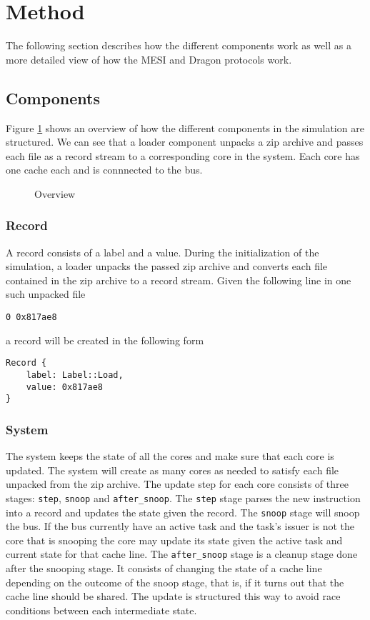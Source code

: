 \section{Method}
The following section describes how the different components work as well as a more detailed view of how the MESI and Dragon protocols work.

\subsection{Components}
Figure \ref{fig:overview} shows an overview of how the different components in the simulation are
structured. We can see that a loader component unpacks a zip archive and passes each file as a
record stream to a corresponding core in the system. Each core has one cache each and is connnected
to the bus.

\begin{figure}[ht]
    \centering
    \caption{Overview}
    \label{fig:overview}
\end{figure}



\subsubsection{Record}

A record consists of a label and a value.  During the initialization of the simulation, a loader
unpacks the passed zip archive and converts each file contained in the zip archive to a record
stream.  Given the following line in one such unpacked file
\begin{lstlisting}
0 0x817ae8
\end{lstlisting}
a record will be created in the following form
\begin{lstlisting}
Record {
    label: Label::Load,
    value: 0x817ae8
}
\end{lstlisting}


\subsubsection{System}
The system keeps the state of all the cores and make sure that each core is updated.
The system will create as many cores as needed to satisfy each file unpacked from the zip archive.
The update step for each core consists of three stages: \texttt{step}, \texttt{snoop} and \texttt{after\_snoop}.
The \texttt{step} stage parses the new instruction into a record and updates the state given the record.
The \texttt{snoop} stage will snoop the bus.
If the bus currently have an active task and the task's issuer is not the core that is snooping the core may update its state given the active task and current state for that cache line.
The \texttt{after\_snoop} stage is a cleanup stage done after the snooping stage.
It consists of changing the state of a cache line depending on the outcome of the snoop stage, that is, if it turns out that the cache line should be shared.
The update is structured this way to avoid race conditions between each intermediate state.


